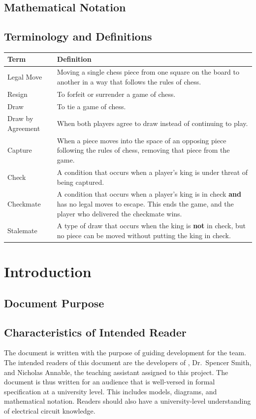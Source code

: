 \documentclass[12pt]{article}
\begin{document}
\subsection{Mathematical Notation}

\subsection{Terminology and Definitions}
\begin{tabularx}{\linewidth}{ l X }
    \toprule		
    \textbf{Term} & \textbf{Definition}\\
    \midrule 
    Legal Move & Moving a single chess piece from one square on the board to another in a way that follows the rules of chess. \\[0.5cm]
    Resign & To forfeit or surrender a game of chess. \\[0.5cm]
    Draw & To tie a game of chess. \\[0.5cm]
    Draw by Agreement & When both players agree to draw instead of continuing to play. \\[0.5cm]
    Capture & When a piece moves into the space of an opposing piece following the rules of chess, removing that piece from the game. \\[0.5cm]
    Check & A condition that occurs when a player's king is under threat of being captured. \\[0.5cm]
    Checkmate & A condition that occurs when a player's king is in check \textbf{and} has no legal moves to escape. 
    This ends the game, and the player who delivered the checkmate wins. \\[0.5cm]
    Stalemate & A type of draw that occurs when the king is \textbf{not} in check, but no piece can be moved without putting the king in check. \\[0.5cm]
    \bottomrule
  \end{tabularx}

\section{Introduction}
\subsection{Document Purpose}
\subsection{Characteristics of Intended Reader}
{The document is written with the purpose of guiding development for the \progname{} team. The intended readers of this document 
are the developers of \progname{}, Dr.~Spencer Smith, and Nicholas Annable, the teaching assistant assigned to this project. The 
document is thus written for an audience that is well-versed in formal specification at a university level. This includes models, 
diagrams, and mathematical notation. Readers should also have a university-level understanding of electrical circuit knowledge.}
\end{document}
